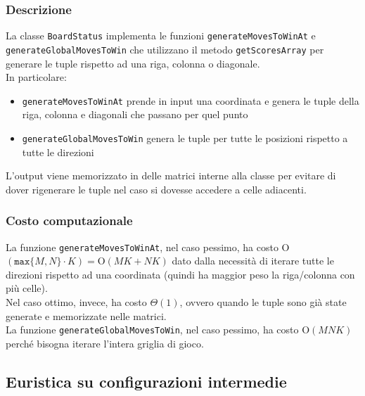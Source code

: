 \documentclass[11pt]{article}
\begin{document}
\subsubsection*{Descrizione}
La classe \texttt{BoardStatus} implementa le funzioni \texttt{generateMovesToWinAt} e \texttt{generateGlobalMovesToWin} che utilizzano il metodo \texttt{getScoresArray} per generare le tuple rispetto ad una riga, colonna o diagonale.\\
In particolare: 
\begin{itemize}
\setlength\itemsep{0.05cm}
	\item \texttt{generateMovesToWinAt} prende in input una coordinata e genera le tuple della riga, colonna e diagonali che passano per quel punto
	\item \texttt{generateGlobalMovesToWin} genera le tuple per tutte le posizioni rispetto a tutte le direzioni
\end{itemize}
L'output viene memorizzato in delle matrici interne alla classe per evitare di dover rigenerare le tuple nel caso si dovesse accedere a celle adiacenti.
\subsubsection*{Costo computazionale}
La funzione \texttt{generateMovesToWinAt}, nel caso pessimo, ha costo O$(\texttt{max}\{M, N\} \cdot K) = \text{O}(MK+NK)$ dato dalla necessità di iterare tutte le direzioni rispetto ad una coordinata (quindi ha maggior peso la riga/colonna con più celle).\\
Nel caso ottimo, invece, ha costo $\Theta(1)$, ovvero quando le tuple sono già state generate e memorizzate nelle matrici.\\
La funzione \texttt{generateGlobalMovesToWin}, nel caso pessimo, ha costo O$(MNK)$ perché bisogna iterare l'intera griglia di gioco.

\newpage

\subsection*{Euristica su configurazioni intermedie}
\end{document}
